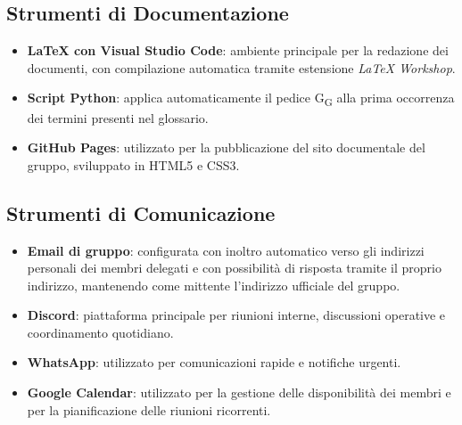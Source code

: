 \subsection{Strumenti di Documentazione}

\begin{itemize}
    \item \textbf{\LaTeX{} con Visual Studio Code}: ambiente principale per la redazione dei
    documenti, con compilazione automatica tramite estensione \textit{LaTeX Workshop}.

    \item \textbf{Script Python}: applica automaticamente il pedice G\textsubscript{G} alla prima occorrenza dei
    termini presenti nel glossario.

    \item \textbf{GitHub Pages}: utilizzato per la pubblicazione del sito documentale del gruppo,
    sviluppato in HTML5 e CSS3.
\end{itemize}

\subsection{Strumenti di Comunicazione}

\begin{itemize}
    \item \textbf{Email di gruppo}: configurata con inoltro automatico verso gli indirizzi personali
    dei membri delegati e con possibilità di risposta tramite il proprio indirizzo, mantenendo
    come mittente l’indirizzo ufficiale del gruppo.

    \item \textbf{Discord}: piattaforma principale per riunioni interne, discussioni operative e
    coordinamento quotidiano.

    \item \textbf{WhatsApp}: utilizzato per comunicazioni rapide e notifiche urgenti.

    \item \textbf{Google Calendar}: utilizzato per la gestione delle disponibilità dei membri e per
    la pianificazione delle riunioni ricorrenti.
\end{itemize}
